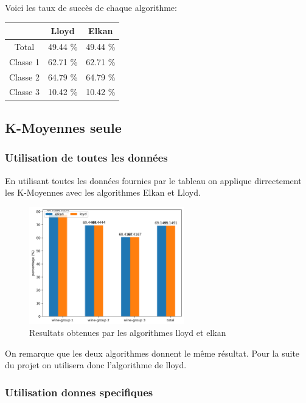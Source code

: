 \documentclass[a4paper,12pt]{article}
\begin{document}
Voici les taux de succès de chaque algorithme: \\
\begin{table}[h!]
  \centering
  \begin{tabular}{| c | c | c |}
    \hline & Lloyd & Elkan \\ \hline
    Total & 49.44 \% & 49.44 \% \\ \hline
    Classe 1 & 62.71 \% & 62.71 \% \\ \hline
    Classe 2 & 64.79 \% & 64.79 \% \\ \hline
    Classe 3 & 10.42 \% & 10.42 \% \\ \hline
  \end{tabular}
\end{table}

\subsection{K-Moyennes seule}
\subsubsection{Utilisation de toutes les données}
En utilisant toutes les données fournies par le tableau on applique dirrectement les K-Moyennes avec les algorithmes Elkan et Lloyd.
\newpage

\begin{figure}[h!] %
   \centering
   \includegraphics[width=0.6\textwidth]{comparaison_algos.png} %
   \caption{Resultats obtenues par les algorithmes lloyd et elkan}
   \label{comparaison_algos.png} %
\end{figure}

On remarque que les deux algorithmes donnent le même résultat. Pour la suite du projet on utilisera donc l'algorithme de lloyd.

\subsubsection{Utilisation donnes specifiques}
\end{document}
